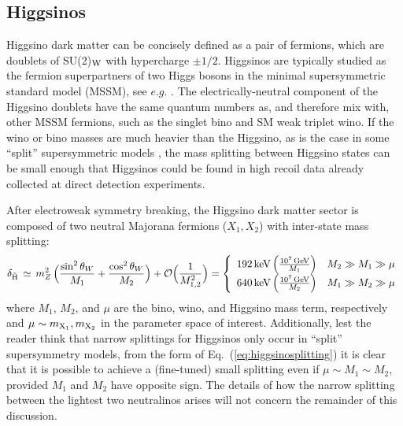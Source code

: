 \documentclass[11pt]{article}
\newcommand{\kev}{{\rm keV}}
\newcommand{\gev}{{\rm GeV}}
\begin{document}
\subsection{Higgsinos}
\label{sec:higgsinos}
Higgsino dark matter can be concisely defined as a pair of fermions, which are doublets of SU(2)$_{\rm W}$ with hypercharge $\pm 1/2$. Higgsinos are typically studied as the fermion superpartners of two Higgs bosons in the minimal supersymmetric standard model (MSSM), see $e.g.$ \cite{Martin:1997ns,ArkaniHamed:2006mb}. The electrically-neutral component of the Higgsino doublets have the same quantum numbers as, and therefore mix with, other MSSM fermions, such as the singlet bino and SM weak triplet wino. If the wino or bino masses are much heavier than the Higgsino, as is the case in some ``split'' supersymmetric models \cite{Fox:2014moa,Nagata:2014wma}, the mass splitting between Higgsino states can be small enough that Higgsinos could be found in high recoil data already collected at direct detection experiments. 

After electroweak symmetry breaking, the Higgsino dark matter sector is composed of two neutral Majorana fermions ($X_1,X_2$) with inter-state mass splitting: 
\begin{equation}
\delta_{\rm \tilde H} \,\simeq\, m^2_Z\, \Big(\frac{\sin^2{\theta_W}}{M_1} + \frac{\cos^2{\theta_W}}{M_2} \Big) + \mathcal O\Big( \frac{1}{M^2_{1,2}} \Big) =  \left\{ \begin{array}{cc} 192\, \kev\, \Big(\frac{10^7\, \gev}{M_1}\Big) & M_2 \gg M_1 \gg \mu \\ 640\, \kev\, \Big(\frac{10^7\, \gev}{M_2}\Big) & M_1 \gg M_2 \gg \mu \end{array}\right.
\label{eq:higgsinosplitting}
\end{equation}
where $M_1$, $M_2$, and $\mu$ are the bino, wino, and Higgsino mass term, respectively and $\mu \sim m_{\rm X_1},m_{\rm X_2}$ in the parameter space of interest. Additionally, lest the reader think that narrow splittings for Higgsinos only occur in ``split'' supersymmetry models, from the form of Eq.~(\ref{eq:higgsinosplitting}) it is clear that it is possible to achieve a (fine-tuned) small splitting even if $\mu \sim M_1 \sim M_2$, provided $M_1$ and $M_2$ have opposite sign. The details of how the narrow splitting between the lightest two neutralinos arises will not concern the remainder of this discussion. 
\end{document}
